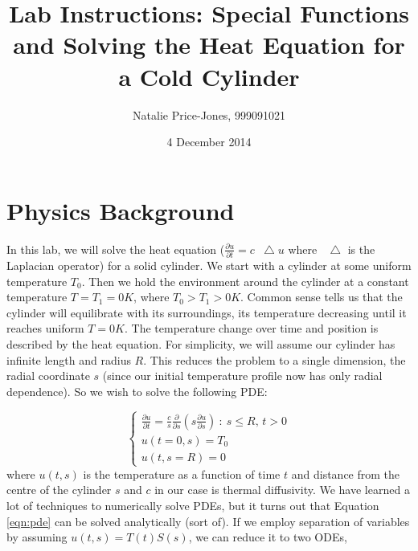\documentclass[a4paper,12pt]{article}
\newcommand*\lap{\mathop{}\!\mathbin\bigtriangleup}
\begin{document}
\onehalfspacing
\title{Lab Instructions: Special Functions and Solving the Heat Equation for a Cold Cylinder}
\author{Natalie Price-Jones, 999091021}
\date{4 December 2014}
\maketitle

\section{Physics Background}
%

In this lab, we will solve the heat equation ($\frac{\partial u}{\partial t} = c\lap u$ where $\lap$ is the Laplacian operator) for a solid cylinder. We start with a cylinder at some uniform temperature $T_0$. Then we hold the environment around the cylinder at a constant temperature $T = T_1 = 0 K$, where $T_0 > T_1 > 0K$. Common sense tells us that the cylinder will equilibrate with its surroundings, its temperature decreasing until it reaches uniform $T = 0K$. The temperature change over time and position is described by the heat equation. For simplicity, we will assume our cylinder has infinite length and radius $R$. This reduces the problem to a single dimension, the radial coordinate $s$ (since our initial temperature profile now has only radial dependence). So we wish to solve the following PDE:

\begin{displaymath}
   \left\{
   	\begin{equation}
     \begin{array}{c}
     \frac{\partial u}{\partial t} = \frac{c}{s}\frac{\partial}{\partial s}\left(s\frac{\partial u}{\partial s}\right)\: : \: s \leq R,\, t > 0\\
     u(t = 0, s)  = T_0\\
     u(t,s = R) = 0
     \end{array}
     \label{eqn:pde}
     \end{equation}
   \right.
\end{displaymath} 
%
where $u(t,s)$ is the temperature as a function of time $t$ and distance from the centre of the cylinder $s$ and $c$ in our case is thermal diffusivity. We have learned a lot of techniques to numerically solve PDEs, but it turns out that Equation \ref{eqn:pde} can be solved analytically (sort of). If we employ separation of variables by assuming $u(t,s) = T(t)S(s)$, we can reduce it to two ODEs,
\end{document}
